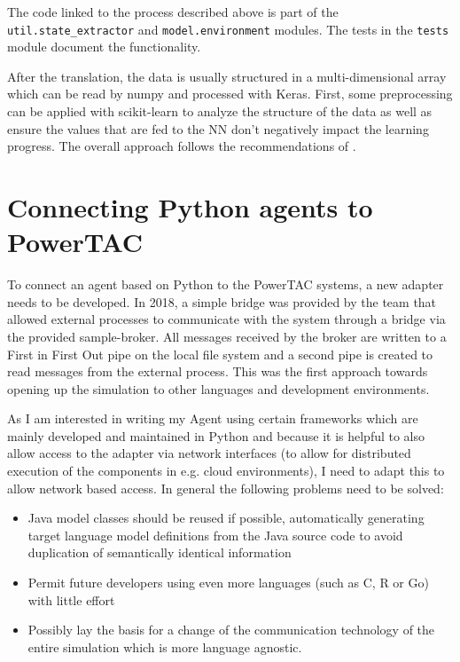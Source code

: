 The code linked to the process described above is part of the \texttt{util.state\_extractor} and
\texttt{model.environment} modules. The tests in the \texttt{tests} module document the functionality.

After the translation, the data is usually structured in a multi-dimensional array which can be read by numpy and
processed with Keras. First, some preprocessing can be applied with scikit-learn to analyze the structure of the data as
well as ensure the values that are fed to the \ac {NN} don't negatively impact the learning progress. The overall
approach follows the recommendations of \citep{Goodfellow-et-al-2016}.  

\section{Connecting Python agents to PowerTAC}

To connect an agent based on Python to the \ac{PowerTAC} systems, a new adapter needs to be developed. In 2018, a simple
bridge was provided by the team that allowed external processes to communicate with the system through a bridge via the
provided sample-broker. All messages received by the broker are written to a First in First Out pipe on the local file
system and a second pipe is created to read messages from the external process. This was the first approach towards
opening up the simulation to other languages and development environments. 

As I am interested in writing my Agent using certain frameworks which are mainly developed and maintained in Python and
because it is helpful to also allow access to the adapter via network interfaces (to allow for distributed execution of
the components in e.g. cloud environments), I need to adapt this to allow network based access. In general the following
problems need to be solved:

\begin{itemize} \item Java model classes should be reused if possible, automatically generating target language model
	definitions from the Java source code to avoid duplication of semantically identical information \item Permit
	future developers using even more languages (such as C, R or Go) with little effort \item Possibly lay the basis
	for a change of the communication technology of the entire simulation which is more language agnostic.
	\end{itemize}

